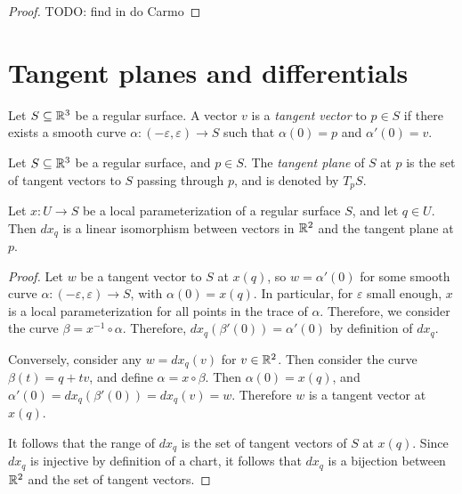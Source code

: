 \begin{proof}
    {\Large\color{red}TODO: find in do Carmo}
\end{proof}

\section{Tangent planes and differentials}

\begin{defn}
    Let $S \subseteq \mathbb{R}^3$ be a regular surface. A vector $v$ is a \emph{tangent vector} to $p \in S$ if there exists a smooth curve $\alpha: (-\varepsilon, \varepsilon) \to S$ such that $\alpha(0) = p$ and $\alpha'(0) = v$.
\end{defn}

\begin{defn}
    Let $S \subseteq \mathbb{R}^3$ be a regular surface, and $p \in S$. The \emph{tangent plane} of $S$ at $p$ is the set of tangent vectors to $S$ passing through $p$, and is denoted by $T_pS$.
\end{defn}

\begin{prop}
    Let $x: U \to S$ be a local parameterization of a regular surface $S$, and let $q \in U$. Then $dx_q$ is a linear isomorphism between vectors in $\mathbb{R}^2$ and the tangent plane at $p$.
\end{prop}

\begin{proof}
    Let $w$ be a tangent vector to $S$ at $x(q)$, so $w = \alpha'(0)$ for some smooth curve $\alpha: (-\varepsilon, \varepsilon) \to S$, with $\alpha(0) = x(q)$. In particular, for $\varepsilon$ small enough, $x$ is a local parameterization for all points in the trace of $\alpha$. Therefore, we consider the curve $\beta = x^{-1} \circ \alpha$. Therefore, $dx_q(\beta'(0)) = \alpha'(0)$ by definition of $dx_q$.

    Conversely, consider any $w = dx_q(v)$ for $v \in \mathbb{R}^2$. Then consider the curve $\beta(t) = q + tv$, and define $\alpha = x \circ \beta$. Then $\alpha(0) = x(q)$, and $\alpha'(0) = dx_q(\beta'(0)) = dx_q(v) = w$. Therefore $w$ is a tangent vector at $x(q)$.

    It follows that the range of $dx_q$ is the set of tangent vectors of $S$ at $x(q)$. Since $dx_q$ is injective by definition of a chart, it follows that $dx_q$ is a bijection between $\mathbb{R}^2$ and the set of tangent vectors.
\end{proof}

